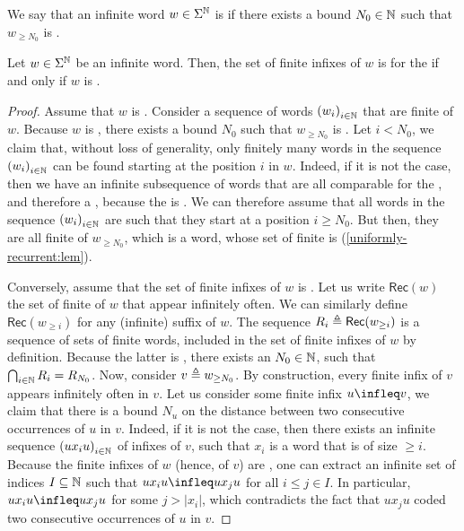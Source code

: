 \AP We say that an infinite word $w \in \Sigma^{\mathbb{N}}$ is  if there exists a bound $N_0 \in \mathbb{N}$ such that $w_{\geq
N_0}$ is .

\begin{lemma}
    \label{ultimately-uniformly-recurrent:lem}
    Let $w \in \Sigma^{\mathbb{N}}$ be an infinite word. 
    Then, the set of finite infixes of $w$ is  for the 
    if and only if $w$ is .
\end{lemma}
\begin{proof}

    Assume that $w$ is . Consider a sequence
    of words $\seqof{w_i}[i \in \Nat]$ that are finite  of $w$. Because $w$ is
    , there exists a bound $N_0$ such that
    $w_{\geq N_0}$ is . Let $i < N_0$, we claim that,
    without loss of generality, only finitely many words in the sequence
    $\seqof{w_i}[i \in \Nat]$ can be found starting at the position $i$ in $w$. Indeed, if
    it is not the case, then we have an infinite subsequence of words that are
    all comparable for the , and therefore a , because the  is . We can
    therefore assume that all words in the sequence $\seqof{w_i}[i \in \Nat]$ are such that
    they start at a position $i \geq N_0$. But then, they are all finite
     of $w_{\geq N_0}$, which is a  word,
    whose set of finite  is 
    (\cref{uniformly-recurrent:lem}).

    Conversely, assume that the set of finite infixes of $w$ is
    . Let us write $\mathsf{Rec}(w)$ the set of finite
     of $w$ that appear infinitely often. We can similarly define
    $\mathsf{Rec}(w_{\geq i})$ for any (infinite) suffix of $w$. The sequence
    $R_i \triangleq \mathsf{Rec}(w_{\geq i})$ is a sequence of  sets of finite words, included in the set of finite infixes of $w$
    by definition. Because the latter is , there exists
    an $N_0 \in \mathbb{N}$, such that $\bigcap_{i \in \mathbb{N}} R_i = R_{N_0}$.
    Now, consider $v \triangleq w_{\geq N_0}$. By construction, 
    every finite infix of $v$ 
    appears infinitely often in $v$. Let us consider 
    some finite infix $u \infleq v$, we claim that there is a bound $N_u$
    on the distance
    between two consecutive occurrences of $u$ in $v$.
    Indeed, if it is not the case, then there exists an infinite sequence
    $\seqof{u x_i u}[i \in \Nat]$ of infixes of $v$, such that $x_i$ is a word that is
    of size $\geq i$.
    Because the finite infixes of $w$ (hence, of $v$) are ,
    one can extract an infinite set of indices $I \subseteq \mathbb{N}$
    such that $u x_i u \infleq u x_{j} u$ for all $i \leq j \in I$.
    In particular, $u x_i u \infleq u x_{j} u$ for some $j > |x_i|$, 
    which contradicts the fact that $u x_j u$ coded two consecutive
    occurrences of $u$ in $v$.


\end{proof}
